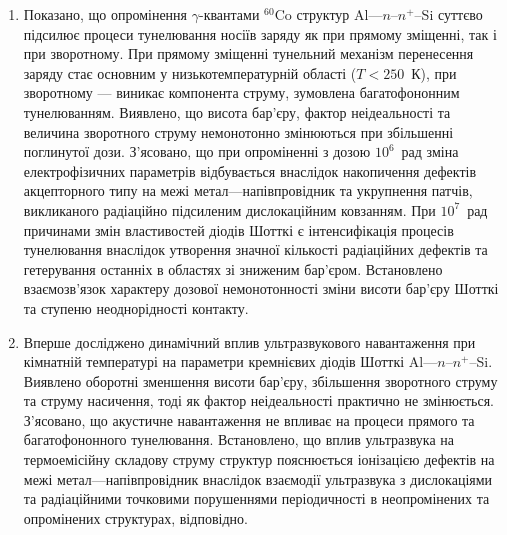 \begin{enumerate}[leftmargin=0cm,itemindent=3em]
\item
     Показано, що опромінення $\gamma$-квантами $^{60}$Co структур Al---$n$--$n^+$--Si суттєво підсилює процеси тунелювання носіїв заряду як при прямому зміщенні, так і при зворотному.
     При прямому зміщенні тунельний механізм перенесення заряду стає основним у низькотемпературній області ($T<250$~К),
 при зворотному --- виникає компонента струму, зумовлена багатофононним тунелюванням.
 Виявлено, що висота бар'єру, фактор неідеальності та величина зворотного струму немонотонно змінюються при збільшенні поглинутої дози.
З'ясовано, що при опроміненні з дозою $10^6$~рад зміна
електрофізичних
параметрів відбувається внаслідок накопичення дефектів акцепторного типу на межі метал---напівпровідник та укрупнення патчів, викликаного радіаційно підсиленим дислокаційним ковзанням.
При 
$10^7$~рад
  причинами змін властивостей діодів Шотткі є інтенсифікація процесів тунелювання внаслідок утворення значної кількості радіаційних дефектів та гетерування останніх в областях зі зниженим бар'єром.
Встановлено взаємозв'язок характеру дозової немонотонності зміни висоти бар'єру Шотткі та ступеню неоднорідності контакту.


\item
Вперше досліджено динамічний вплив ультразвукового навантаження при кімнатній температурі на параметри кремнієвих діодів Шотткі Al---$n$--$n^+$--Si.
Виявлено
оборотні зменшення висоти бар'єру,
збільшення зворотного струму та струму насичення, тоді як фактор неідеальності практично не змінюється.
З'ясовано, що акустичне навантаження не впливає на процеси прямого та багатофононного тунелювання.
Встановлено, що вплив ультразвука на термоемісійну складову струму структур пояснюється іонізацією дефектів на межі метал---напівпровідник
  внаслідок взаємодії ультразвука з дислокаціями та радіаційними точковими порушеннями періодичності в неопромінених та опромінених структурах, відповідно.


\end{enumerate}
